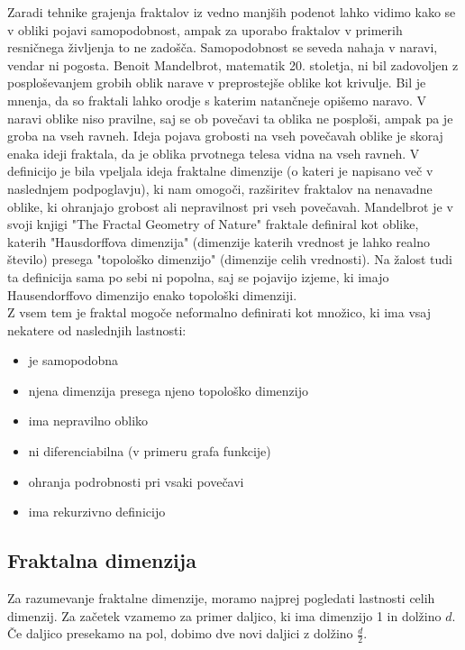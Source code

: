\documentclass[a4paper, 12px]{article}
\begin{document}
        \addvspace{0.5cm}
        Zaradi tehnike grajenja fraktalov iz vedno manjših podenot lahko vidimo kako se v obliki pojavi samopodobnost, ampak za uporabo fraktalov v primerih resničnega življenja to ne zadošča.
        Samopodobnost se seveda nahaja v naravi, vendar ni pogosta.
        Benoit Mandelbrot, matematik 20. stoletja, ni bil zadovoljen z posploševanjem grobih oblik narave v preprostejše oblike kot krivulje.
        Bil je mnenja, da so fraktali lahko orodje s katerim natančneje opišemo naravo.
        V naravi oblike niso pravilne, saj se ob povečavi ta oblika ne posploši, ampak pa je groba na vseh ravneh.
        Ideja pojava grobosti na vseh povečavah oblike je skoraj enaka ideji fraktala, da je oblika prvotnega telesa vidna na vseh ravneh.
        V definicijo je bila vpeljala ideja fraktalne dimenzije (o kateri je napisano več v naslednjem podpoglavju), ki nam omogoči, razširitev fraktalov na nenavadne oblike, ki ohranjajo grobost ali nepravilnost pri vseh povečavah.
        Mandelbrot je v svoji knjigi "The Fractal Geometry of Nature" fraktale definiral kot oblike, katerih "Hausdorffova dimenzija" (dimenzije katerih vrednost je lahko realno število) presega "topološko dimenzijo" (dimenzije celih vrednosti).
        Na žalost tudi ta definicija sama po sebi ni popolna, saj se pojavijo izjeme, ki imajo Hausendorffovo dimenzijo enako topološki dimenziji.
        \cite{FractalDefinitionVideo}
        \cite{HausdorffDimension}\\

        Z vsem tem je fraktal mogoče neformalno definirati kot množico, ki ima vsaj nekatere od naslednjih lastnosti:
        \cite{irvsic2015fraktalna}
        \begin{itemize}
            \item je samopodobna
            \item njena dimenzija presega njeno topološko dimenzijo
            \item ima nepravilno obliko
            \item ni diferenciabilna (v primeru grafa funkcije)
            \item ohranja podrobnosti pri vsaki povečavi
            \item ima rekurzivno definicijo
        \end{itemize}

    \subsection{Fraktalna dimenzija}
        Za razumevanje fraktalne dimenzije, moramo najprej pogledati lastnosti celih dimenzij.
        Za začetek vzamemo za primer daljico, ki ima dimenzijo 1 in dolžino $d$.
        Če daljico presekamo na pol, dobimo dve novi daljici z dolžino $\frac{d}{2}$.
        
\end{document}
